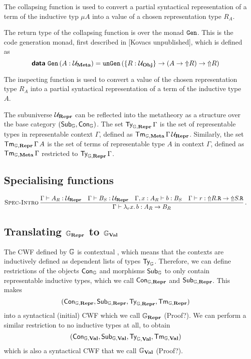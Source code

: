 The collapsing function is used to convert a partial syntactical representation
of a term of the inductive typ $\mu A$ into a value of a chosen representation
type $R_A$.

The return type of the collapsing function is over the monad $\Gen$. This is
the code generation monad, first described in [Kovacs unpublished], which is
defined as
\[
  \data{Gen} \, (A : \Um) = \defin{unGen} \, (\{ R : \Uo \} \to (A \to \lift R) \to \lift R)
\]

The inspecting function is used to convert a value of the chosen representation
type $R_A$ into a partial syntactical representation of a term of the inductive
type $A$.

The subuniverse $\Ur$ can be reflected into the metatheory as a structure over
the base category $(\Sub_{\catG}, \Con_{\catG})$. The set
$\Ty_{\catG,\mR}\,\Gamma$ is the set of representable types in representable
context $\Gamma$, defined as $\Tm_{\catG,\mM}\,\Gamma\,\Ur$. Similarly, the set
$\Tm_{\catG,\mR}\,\Gamma\,A$ is the set of terms of representable type $A$ in
context $\Gamma$, defined as $\Tm_{\catG,\mM}\,\Gamma$ restricted to
$\Ty_{\catG,\mR}\,\Gamma$.

\subsection{Specialising functions}

\[
  \infrule[Spec-Intro]{\Gamma \vdash A_R : \Ur \quad \Gamma \vdash B_S : \Ur \quad \Gamma, x : A_R \vdash b : B_S \quad \Gamma \vdash r : \lift{R.\defin R} \to \lift{S.\defin R}}
  {\Gamma \vdash \lambda_r x . \, b : A_R \to B_R} \,.
\]

\subsection{Translating $\catG_\mR$ to $\catG_\mV$}

The CWF defined by $\catG$ is contextual \cite{Castellan2019-sh}, which means
that the contexts are inductively defined as dependent lists of types
$\Ty_\cat{G}$. Therefore, we can define restrictions of the objects
$\Con_{\catG}$ and morphisms $\Sub_{\catG}$ to only contain representable
inductive types, which we call $\Con_{\catG,\mR}$ and $\Sub_{\catG,\mR}$. This
makes
\[
  (\Con_{\catG, \mR}, \Sub_{\catG, \mR}, \Ty_{\catG, \mR}, \Tm_{\catG, \mR})
\]
into a syntactical (initial) CWF which we call $\catG_\mR$ (Proof?). We can
perform a similar restriction to no inductive types at all, to obtain
\[
  (\Con_{\catG, \mV}, \Sub_{\catG, \mV}, \Ty_{\catG, \mV}, \Tm_{\catG, \mV})
\]
which is also a syntactical CWF that we call $\catG_\mV$ (Proof?).

